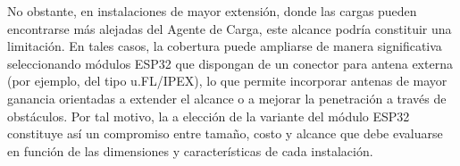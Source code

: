 No obstante, en instalaciones de mayor extensión, donde las cargas pueden encontrarse más alejadas del Agente de Carga, este alcance podría constituir una limitación. En tales casos, la cobertura puede ampliarse de manera significativa seleccionando módulos ESP32 que dispongan de un conector para antena externa (por ejemplo, del tipo u.FL/IPEX), lo que permite incorporar antenas de mayor ganancia orientadas a extender el alcance o a mejorar la penetración a través de obstáculos. Por tal motivo, la 
a elección de la variante del módulo ESP32 constituye así un compromiso entre tamaño, costo y alcance que debe evaluarse en función de las dimensiones y características de cada instalación. 


